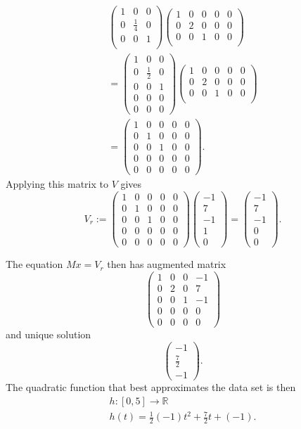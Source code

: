 \documentclass[12pt]{article}
\def\R{{\mathbb{R}}}
\def\bv{\left(\begin{array}{c}}
\def\ev{\end{array}\right) }
\begin{document}
\begin{gather*}
\left( \begin{array}{rrr}
1 &0&0\\
0      &\frac14&0\\
0&0&1\\
\end{array} \right)
\left( \begin{array}{rrrrr}
1 &0&0&0&0\\
0      &2&0&0&0\\
0&0&1&0&0\\
\end{array} \right)
\\= 
\left( \begin{array}{rrr}
1 &0&0\\
0      &\frac12&0\\
0&0&1\\
0&0&0\\
0&0&0
\end{array} \right)
\left( \begin{array}{rrrrr}
1 &0&0&0&0\\
0      &2&0&0&0\\
0&0&1&0&0\\
\end{array} \right)
\\= 
\left( \begin{array}{rrrrr}
1 &0&0&0&0\\
0      &1&0&0&0\\
0&0&1&0&0\\
0&0&0&0&0\\
0&0&0&0&0
\end{array} \right).
\end{gather*}
Applying this matrix to $V$ gives 
\[
V_r:=\left( \begin{array}{rrrrr}
1 &0&0&0&0\\
0      &1&0&0&0\\
0&0&1&0&0\\
0&0&0&0&0\\
0&0&0&0&0
\end{array} \right) 
\bv -1\\7\\-1\\1\\0 \ev 
=
\bv -1\\7\\-1\\0\\0 \ev.
\]

The equation $Mx=V_r$ then has augmented matrix 
\[
\left( \begin{array}{rrr|r}
1 &0&0&-1\\
0      &2&0&7\\
0&0&1&-1\\
0&0&0&0\\
0&0&0&0
\end{array} \right)
\]
and unique solution 
\[\bv -1\\ \frac72 \\-1 \ev. \]
The quadratic function that best approximates the data set is then 
\begin{gather*} h:[0,5] \to \R\\
h(t)=\frac12 (-1) t^2 +\frac72 t +(-1).\end{gather*}
\end{document}

